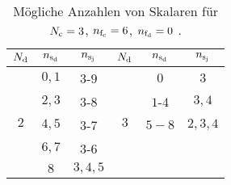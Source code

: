 \begin{table}
\centering

 \begin{tabular}{ccc|ccc}
 \toprule \midrule
$N_\text{d}$ & $n_{\text{s}_\text{d}}$ & $n_{\text{s}_\text{j}}$ &	 $N_\text{d}$ & $n_{\text{s}_\text{d}}$ & $n_{\text{s}_\text{j}}$	\\
\midrule
\multirow{5}{*}{2}& $0,1$& $3$-$9$    & \multirow{5}{*}{3} &$0$&$3$\\
 &  $2,3$& $3$-$8$ &  &$1$-$4$&$3,4$\\
 &  $4,5$&$3$-$7$  &  &$5-8$&$2,3,4$\\
 &  $6,7$&$3$-$6$ \\
 &  $8$&$3,4,5$\\    

  \midrule \bottomrule
 \end{tabular}
\caption{Mögliche Anzahlen von Skalaren für $N_\text{c}=3$, $n_{\text{f}_\text{c}}=6$, $n_{\text{f}_\text{d}}=0$ .}
\label{tab:QCDxdQCD:Sattelpunkt_mit_Skalaren}
\end{table}
